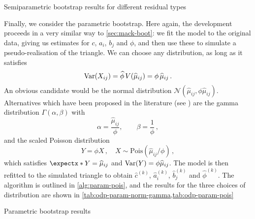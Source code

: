 \documentclass[a4paper]{book}
\begin{document}
\begin{table}
  \begin{subtable}{0.5\linewidth}
    
  \end{subtable}
  \hfill
  \begin{subtable}{0.5\linewidth}
    
  \end{subtable}
  \caption{Semiparametric bootstrap results for different residual types}
  \label{tab:semiparam-pois-res}
\end{table}

Finally, we consider the parametric bootstrap. Here again, the development proceeds in a very similar way to \cref{sec:mack-boot}: we fit the model to the original data, giving us estimates for $c$, $a_i$, $b_j$ and $\phi$, and then use these to simulate a pseudo-realisation of the triangle. We can choose any distribution, as long as it satisfies
\begin{equation}
  \var{X_{ij}} = \widehat{\phi} \, V(\widehat{\mu}_{ij}) = \phi \, \widehat{\mu}_{ij} \,.
\end{equation}
An obvious candidate would be the normal distribution $\mathcal{N}(\widehat{\mu}_{ij}, \phi \widehat{\mu}_{ij})$. Alternatives which have been proposed in the literature (see \cite{england:add-anal-boot-est}) are the gamma distribution $\Gamma(\alpha, \beta)$ with
\begin{equation}
  \alpha = \frac{\widehat{\mu}_{ij}}{\phi}, \qquad \beta = \frac{1}{\phi} \,,
\end{equation}
and the scaled Poisson distribution
\begin{equation}
  Y = \phi X \,, \quad X \sim \mathrm{Pois}(\widehat{\mu}_{ij} / \phi) \,,
\end{equation}
which satisfies $\expect{Y} = \widehat{\mu}_{ij}$ and $\var{Y} = \phi \widehat{\mu}_{ij}$.
The model is then refitted to the simulated triangle to obtain $\widehat{c}^{(k)}$, $\widehat{a}^{(k)}_i$, $\widehat{b}^{(k)}_j$ and $\widehat{\phi}^{(k)}$. The algorithm is outlined in \cref{alg:param-pois}, and the results for the three choices of distribution are shown in \cref{tab:odp-param-norm-gamma,tab:odp-param-pois}

\begin{table}[!htb]
  \centering
  \begin{subtable}{0.45\linewidth}
    
  \end{subtable}
  \hfill
  \begin{subtable}{0.45\linewidth}
    
  \end{subtable}
  \caption{Parametric bootstrap results}
  \label{tab:odp-param-norm-gamma}
\end{table}
\end{document}
